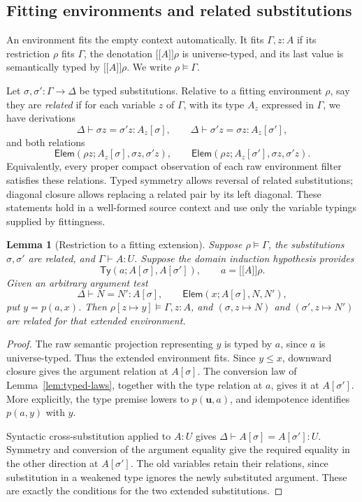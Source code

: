 \documentclass[11pt,a4paper]{article}
\newtheorem{lemma}[theorem]{Lemma}
\theoremstyle{definition}
\theoremstyle{remark}
\newcommand{\ev}[1]{\mathopen{[\![}#1\mathclose{]\!]}}
\newcommand{\TyRel}{\mathsf{Ty}}
\newcommand{\ElemRel}{\mathsf{Elem}}
\begin{document}
\subsection{Fitting environments and related substitutions}

An environment fits the empty context automatically. It fits
$\Gamma,z:A$ if its restriction $\rho$ fits $\Gamma$, the denotation
$\ev A\rho$ is universe-typed, and its last value is semantically typed
by $\ev A\rho$. We write $\rho\models\Gamma$.

Let $\sigma,\sigma':\Gamma\to\Delta$ be typed substitutions. Relative
to a fitting environment $\rho$, say they are \emph{related} if for each
variable $z$ of $\Gamma$, with its type $A_z$ expressed in $\Gamma$,
we have derivations
\[
 \Delta\vdash\sigma z=\sigma'z:A_z[\sigma],\qquad
 \Delta\vdash\sigma'z=\sigma z:A_z[\sigma'],
\]
and both relations
\begin{equation}\label{eq:related-substitutions}
 \ElemRel(\rho z;A_z[\sigma],\sigma z,\sigma'z),\qquad
 \ElemRel(\rho z;A_z[\sigma'],\sigma z,\sigma'z).
\end{equation}
Equivalently, every proper compact observation of each raw environment
filter satisfies these relations. Typed symmetry allows reversal of
related substitutions; diagonal closure allows replacing a related pair
by its left diagonal. These statements hold in a well-formed source
context and use only the variable typings supplied by fittingness.

\begin{lemma}[Restriction to a fitting extension]\label{lem:argument-restriction}
Suppose $\rho\models\Gamma$, the substitutions $\sigma,\sigma'$ are
related, and $\Gamma\vdash A:U$. Suppose the domain induction hypothesis
provides
\[
 \TyRel(a;A[\sigma],A[\sigma']),\qquad a=\ev A\rho.
\]
Given an arbitrary argument test
\[
 \Delta\vdash N=N':A[\sigma],\qquad
 \ElemRel(x;A[\sigma],N,N'),
\]
put $y=p(a,x)$. Then $\rho[z\mapsto y]\models\Gamma,z:A$, and
$(\sigma,z\mapsto N)$ and $(\sigma',z\mapsto N')$ are related for
that extended environment.
\end{lemma}
\begin{proof}
The raw semantic projection representing $y$ is typed by $a$, since
$a$ is universe-typed. Thus the extended environment fits. Since
$y\leq x$, downward closure gives the argument relation at $A[\sigma]$.
The conversion law of Lemma~\ref{lem:typed-laws}, together with the type
relation at $a$, gives it at $A[\sigma']$. More explicitly, the type
premise lowers to $p(\mathbf u,a)$, and idempotence identifies
$p(a,y)$ with $y$.

Syntactic cross-substitution applied to $A:U$ gives
$\Delta\vdash A[\sigma]=A[\sigma']:U$. Symmetry and conversion of the
argument equality give the required equality in the other direction at
$A[\sigma']$. The old variables retain their relations, since substitution
in a weakened type ignores the newly substituted argument. These are
exactly the conditions for the two extended substitutions.
\end{proof}
\end{document}
